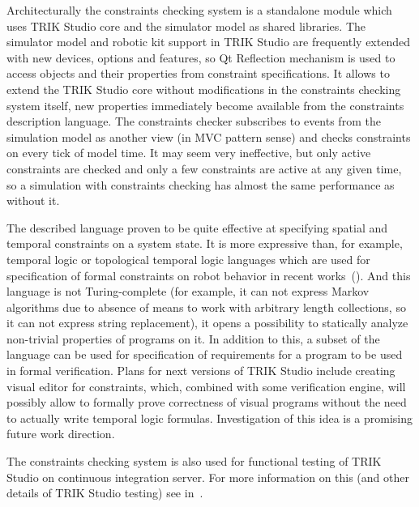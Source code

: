 \documentclass[conference]{IEEEtran}
\begin{document}
Architecturally the constraints checking system is a standalone module which uses TRIK Studio core and the simulator model as shared libraries. The simulator model and robotic kit support in TRIK Studio are frequently extended with new devices, options and features, so Qt Reflection mechanism is used to access objects and their properties from constraint specifications. It allows to extend the TRIK Studio core without modifications in the constraints checking system itself, new properties immediately become available from the constraints description language. The constraints checker subscribes to events from the simulation model as another view (in MVC pattern sense) and checks constraints on every tick of model time. It may seem very ineffective, but only active constraints are checked and only a few constraints are active at any given time, so a simulation with constraints checking has almost the same performance as without it.

The described language proven to be quite effective at specifying spatial and temporal constraints on a system state. It is more expressive than, for example, temporal logic or topological temporal logic languages which are used for specification of formal constraints on robot behavior in recent works~(\cite{mordvinov2016formal,kress2007s,бугайченко2007разработка,дмитриев2013адаптация}). And this language is not Turing-complete (for example, it can not express Markov algorithms due to absence of means to work with arbitrary length collections, so it can not express string replacement), it opens a possibility to statically analyze non-trivial properties of programs on it. In addition to this, a subset of the language can be used for specification of requirements for a program to be used in formal verification. Plans for next versions of TRIK Studio include creating visual editor for constraints, which, combined with some verification engine, will possibly allow to formally prove correctness of visual programs without the need to actually write temporal logic formulas. Investigation of this idea is a promising future work direction.

The constraints checking system is also used for functional testing of TRIK Studio on continuous integration server. For more information on this (and other details of TRIK Studio testing) see in~\cite{mordvinov2016testing}.
\end{document}
